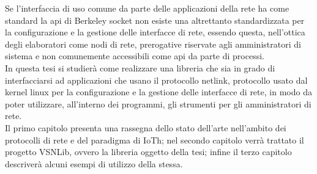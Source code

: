 Se l'interfaccia di uso comune da parte delle applicazioni della rete ha come standard la api di Berkeley socket non esiste una altrettanto standardizzata per la configurazione e la gestione delle interfacce di rete, essendo questa, nell'ottica degli elaboratori come nodi di rete, prerogative riservate agli amministratori di sistema e non comunemente accessibili come api da parte di processi.\\
In questa tesi si studier\`a come realizzare una libreria che sia in grado di interfacciarsi ad applicazioni che usano il protocollo netlink, protocollo usato dal kernel linux per la configurazione e la gestione delle interfacce di rete, in modo da poter utilizzare, all'interno dei programmi, gli strumenti per gli amministratori di rete.\\
Il primo capitolo presenta una rassegna dello stato dell'arte nell'ambito dei protocolli di rete e del paradigma di IoTh; nel secondo capitolo verr\`a trattato il progetto VSNLib, ovvero la libreria oggetto della tesi; infine il terzo capitolo descriver\`a alcuni esempi di utilizzo della stessa.
\clearpage{\pagestyle{empty}\cleardoublepage}
\tableofcontents                        %
\rhead[\fancyplain{}{\bfseries\leftmark}]{\fancyplain{}{\bfseries\thepage}}
\clearpage{\pagestyle{empty}\cleardoublepage}
\listoffigures                          %
\clearpage{\pagestyle{empty}\cleardoublepage}
\listoftables                           %
\clearpage{\pagestyle{empty}\cleardoublepage}
